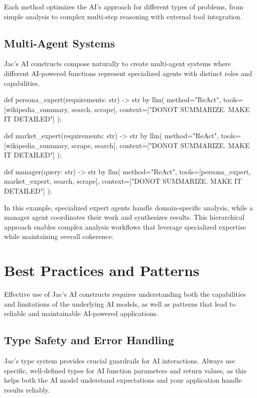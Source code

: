 Each method optimizes the AI's approach for different types of problems, from simple analysis to complex multi-step reasoning with external tool integration.

\subsection{Multi-Agent Systems}

Jac's AI constructs compose naturally to create multi-agent systems where different AI-powered functions represent specialized agents with distinct roles and capabilities.

\begin{jacblock}
def persona_expert(requirements: str) -> str by llm(
    method="ReAct",
    tools=[wikipedia_summary, search, scrape],
    context=["DONOT SUMMARIZE. MAKE IT DETAILED"]
);

def market_expert(requirements: str) -> str by llm(
    method="ReAct",
    tools=[wikipedia_summary, scrape, search],
    context=["DONOT SUMMARIZE. MAKE IT DETAILED"]
);

def manager(query: str) -> str by llm(
    method="ReAct",
    tools=[persona_expert, market_expert, search, scrape],
    context=["DONOT SUMMARIZE. MAKE IT DETAILED"]
);
\end{jacblock}

In this example, specialized expert agents handle domain-specific analysis, while a manager agent coordinates their work and synthesizes results. This hierarchical approach enables complex analysis workflows that leverage specialized expertise while maintaining overall coherence.

\section{Best Practices and Patterns}

Effective use of Jac's AI constructs requires understanding both the capabilities and limitations of the underlying AI models, as well as patterns that lead to reliable and maintainable AI-powered applications.

\subsection{Type Safety and Error Handling}

Jac's type system provides crucial guardrails for AI interactions. Always use specific, well-defined types for AI function parameters and return values, as this helps both the AI model understand expectations and your application handle results reliably.

